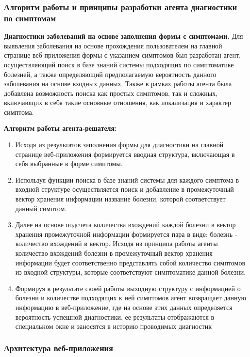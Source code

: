 \subsubsection{Алгоритм работы и принципы разработки агента диагностики по симптомам}
\textbf{Диагностики заболеваний на основе заполнения формы с симптомами.} Для выявления заболевания на основе прохождения пользователем на главной странице веб-приложения формы с указанием симптомов был разработан агент, осуществляющий поиск в базе знаний системы подходящих по симптоматике болезней, а также определяющий предполагаемую вероятность данного заболевания на основе входных данных. Также в рамках работы агента была добавлена возможность поиска как простых симптомов, так и сложных, включающих в себя такие основные отношения, как локализация и характер симптома.

\textbf{Алгоритм работы агента-решателя:}

\begin{enumerate}[label=\arabic*)]
    \item Исходя из результатов заполнения формы для диагностики на главной странице веб-приложения формируется вводная структура, включающая в себя выбранные в форме симптомы.
    \item Используя функции поиска в базе знаний системы для каждого симптома в входной структуре осуществляется поиск и добавление в промежуточный вектор хранения информации название болезни, которой соответствует данный симптом.
    \item Далее на основе подсчета количества вхождений каждой болезни в вектор хранения промежуточной информации формируется пара в виде: болезнь - количество вхождений в вектор. Исходя из принципа работы агенты количество вхождений болезни в промежуточный вектор хранения информации будет соответственно представлять собой количество симптомов из входной структуры, которые соответствуют симптоматике данной болезни.
    \item Формируя в результате своей работы выходную структуру с информацией о болезни и количестве подходящих к ней симптомов агент возвращает данную информацию в веб-приложение, где на основе этих данных определяется вероятность успешной диагностики, ее результаты отображаются в специальном окне и заносятся в историю проводимых диагностик 
\end{enumerate}


\subsubsection{Архитектура веб-приложения}

